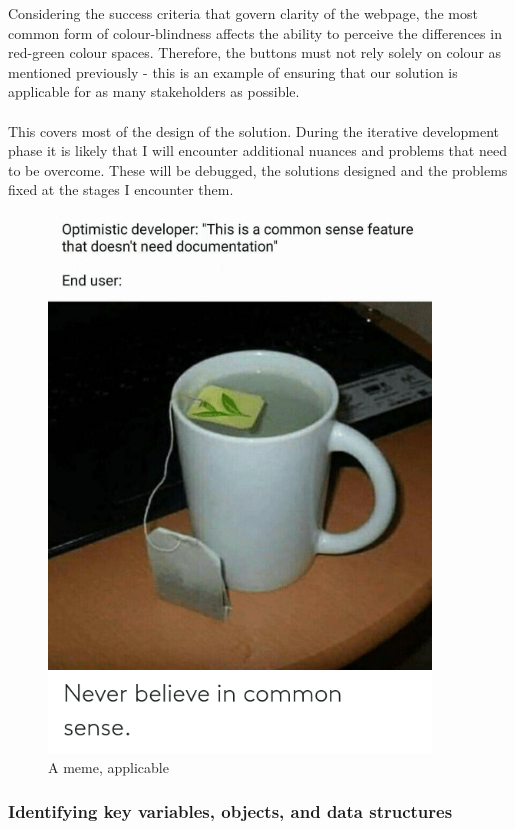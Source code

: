\documentclass[9pt]{article}
\begin{document}
Considering the success criteria that govern clarity of the webpage, the most common form of colour-blindness affects the ability to perceive the differences in red-green colour spaces\cite{colourBlindness}. Therefore, the buttons must not rely solely on colour as mentioned previously - this is an example of ensuring that our solution is applicable for as many stakeholders as possible.\\\\
This covers most of the design of the solution. During the iterative development phase it is likely that I will encounter additional nuances and problems that need to be overcome. These will be debugged, the solutions designed and the problems fixed at the stages I encounter them.
\begin{figure}[H]
	\centering
	\includegraphics[width=4in]{figs/meme}
	\caption{A meme, applicable}
	\label{fig:meme}
\end{figure}

		
\newpage
\subsubsection{Identifying key variables, objects, and data structures}
\end{document}
